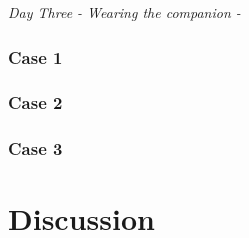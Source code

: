 \documentclass[letterpaper, 10 pt, conference]{ieeeconf}  %
\begin{document}
\textit{Day Three - Wearing the companion - }

\subsubsection{Case 1}

\subsubsection{Case 2}

\subsubsection{Case 3}




\section{Discussion}

\end{document}
